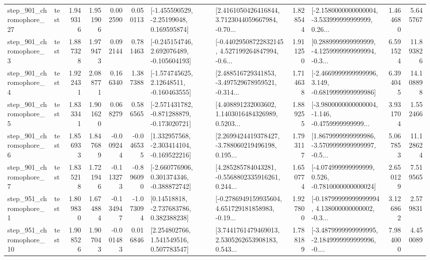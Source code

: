 \begin{tabular}{llrrrrllrlrr}
  step\_901\_chromophore\_27 &      test &      1.949316 &    1.951906 &      0.002590 &  0.050113 &    [-1.455590529, -2.25199048, 0.169595874] &  [2.4161050426416844, 3.7123044059667984, -0.70... &       1.828544 &  [-2.1580000000000004, -3.533999999999999, 0.26... &            1.464680 &          5.645767 \\
   step\_901\_chromophore\_3 &      test &      1.887328 &    1.979473 &      0.092144 &  0.781463 &   [-0.245154746, 2.692076489, -0.105604193] &  [-0.44029508722832145, 4.527199264847994, -0.6... &       1.911250 &  [0.2889999999999999, -4.1259999999999994, -0.3... &            6.591524 &         11.893826 \\
   step\_901\_chromophore\_4 &      test &      1.922431 &    2.088771 &      0.166340 &  1.387388 &    [-1.574745625, 2.12648511, -0.160463555] &  [2.488516729341853, -3.497529678959521, -0.314... &       1.714638 &  [-2.4669999999999996, 3.149, -0.6819999999999986] &            6.394045 &         14.108898 \\
   step\_901\_chromophore\_5 &      test &      1.833341 &    1.901620 &      0.068279 &  0.586565 &  [-2.571431782, -0.871288879, -0.173020721] &  [4.408891232003602, 1.1403016484326989, 0.5203... &       1.889255 &  [-3.9800000000000004, -1.146, -0.4759999999999... &            3.931704 &          1.552466 \\
   step\_901\_chromophore\_6 &      test &      1.856933 &    1.847689 &     -0.009244 & -0.046535 &   [1.332957568, -2.303414104, -0.169522216] &  [2.2699424419378427, -3.788060219496198, 0.195... &       1.793117 &  [1.8679999999999986, -3.5709999999999997, -0.5... &            5.067853 &         11.128624 \\
   step\_901\_chromophore\_7 &      test &      1.835218 &    1.721946 &     -0.113273 & -0.896090 &   [-2.660776906, 0.301374346, -0.388872742] &  [4.285285784043281, -0.5568802335916261, 0.244... &       1.650774 &   [-4.074999999999999, 0.526, -0.7810000000000024] &            2.650129 &          7.519565 \\
   step\_951\_chromophore\_1 &      test &      1.809830 &    1.674884 &     -0.134947 & -1.073094 &     [0.14518818, -2.737683786, 0.382388238] &  [-0.2786949159935604, 4.651729181858983, -0.19... &       1.927800 &  [-0.18799999999999994, 4.138000000000002, -0.3... &            3.126862 &          2.579831 \\
  step\_951\_chromophore\_10 &      test &      1.908526 &    1.907043 &     -0.001483 &  0.016846 &     [2.254802766, 1.541549516, 0.507783547] &  [3.7441761479469013, 2.5305262653908183, 0.543... &       1.788189 &  [-3.4879999999999995, -2.1849999999999996, -0.... &            7.984000 &          4.450089 \\

\end{tabular}
